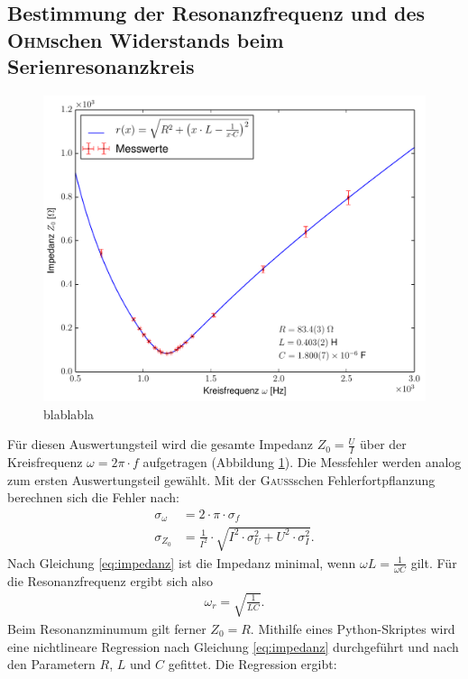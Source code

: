 \documentclass[12pt,a4paper,titlepage,headinclude]{scrartcl}
\numberwithin{equation}{section}
\newcommand{\person}[1]{\textsc{#1}}
\begin{document}
\subsection{Bestimmung der Resonanzfrequenz und des \person{Ohm}schen Widerstands beim Serienresonanzkreis}
\begin{figure}[h!]
	\centering
	\includegraphics[width=\textwidth]{plot2.pdf}
	\caption{blablabla}
	\label{fig:plot2}
\end{figure}
Für diesen Auswertungsteil wird die gesamte Impedanz $Z_0=\frac{U}{I}$ über der Kreisfrequenz $\omega=2\pi\cdot f$ aufgetragen (Abbildung \ref{fig:plot2}). Die Messfehler werden analog zum ersten Auswertungsteil gewählt. Mit der \person{Gauss}schen Fehlerfortpflanzung berechnen sich die Fehler nach:
\begin{align}
	\sigma_{\omega}&=2 \cdot \pi \cdot \sigma_{f}\\
	\sigma_{Z_0}&=\frac{1}{I^{2}} \cdot \sqrt{I^{2} \cdot \sigma_{U}^{2} + U^{2} \cdot \sigma_{I}^{2}}.
	\label{eq:sigmaomegaz02}
\end{align}
Nach Gleichung \eqref{eq:impedanz} ist die Impedanz minimal, wenn $\omega L =\frac{1}{\omega C}$ gilt. Für die Resonanzfrequenz ergibt sich also
\begin{align}
	\omega_r=\sqrt{\frac{1}{LC}}.
	\label{eq:resonanz}
\end{align}
Beim Resonanzminumum gilt ferner $Z_0=R$. Mithilfe eines Python-Skriptes wird eine nichtlineare Regression nach Gleichung \eqref{eq:impedanz} durchgeführt und nach den Parametern $R$, $L$ und $C$ gefittet. Die Regression ergibt:
\end{document}
